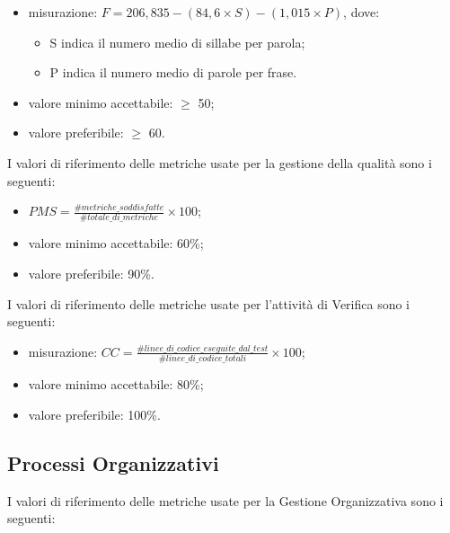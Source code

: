 			 \begin{itemize}
				\item{misurazione: $ F = 206,835 - (84,6 \times S) - (1,015 \times P) $, dove: 
				\begin{itemize}
					\item S indica il numero medio di sillabe per parola; 
					\item P indica il numero medio di parole per frase. 
				\end{itemize}}
				\item{valore minimo accettabile: $\geq$ 50;}
				\item{valore preferibile: $\geq$ 60.}
			\end{itemize}

	I valori di riferimento delle metriche usate per la gestione della qualità sono i seguenti:
	
			\begin{itemize}
				\item{$PMS=\displaystyle\frac{\#metriche\_soddisfatte}{\#totale\_di\_metriche} \times 100$;}
				\item{valore minimo accettabile: 60\%;}
				\item{valore preferibile: 90\%.}
			\end{itemize}
					
	I valori di riferimento delle metriche usate per l'attività di Verifica sono i seguenti:
	
		 	\begin{itemize}
				\item{misurazione: $ CC = \displaystyle\frac{\#linee\_di\_codice\_eseguite\_dal\_test}{\#linee\_di\_codice\_totali} \times 100$;}
				\item{valore minimo accettabile: 80\%;}
				\item{valore preferibile: 100\%.}
			\end{itemize}

\subsection{Processi Organizzativi}

	I valori di riferimento delle metriche usate per la Gestione Organizzativa sono i seguenti:
	
